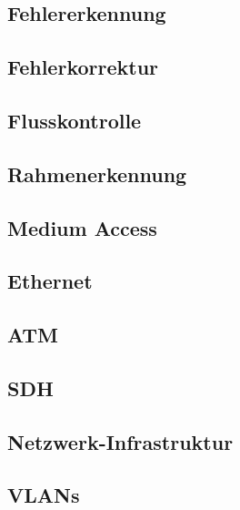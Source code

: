 \documentclass[a4paper,10pt]{scrartcl}
\begin{document}
\subsection{Fehlererkennung}
\subsection{Fehlerkorrektur}
\subsection{Flusskontrolle}
\subsection{Rahmenerkennung}
\subsection{Medium Access}
\subsection{Ethernet}
\subsection{ATM}
\subsection{SDH}
\subsection{Netzwerk-Infrastruktur}
\subsection{VLANs}
\end{document}

